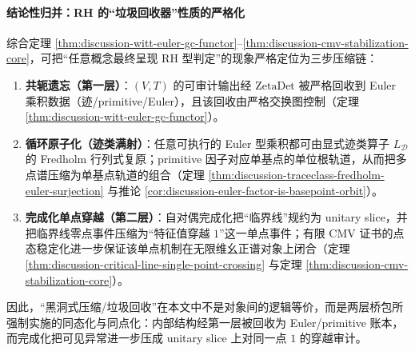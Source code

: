 \paragraph{结论性归并：RH 的“垃圾回收器”性质的严格化}
综合定理 \ref{thm:discussion-witt-euler-gc-functor}--\ref{thm:discussion-cmv-stabilization-core}，可把“任意概念最终呈现 RH 型判定”的现象严格定位为三步压缩链：
\begin{enumerate}
  \item \textbf{共轭遗忘（第一层）}：\((V,T)\) 的可审计输出经 \(\mathrm{ZetaDet}\) 被严格回收到 Euler 乘积数据（迹/primitive/Euler），且该回收由严格交换图控制（定理 \ref{thm:discussion-witt-euler-gc-functor}）。
  \item \textbf{循环原子化（迹类满射）}：任意可执行的 Euler 型乘积都可由显式迹类算子 \(L_{\mathcal D}\) 的 Fredholm 行列式复原；primitive 因子对应单基点的单位根轨道，从而把多点谱压缩为单基点轨道的组合（定理 \ref{thm:discussion-traceclass-fredholm-euler-surjection} 与推论 \ref{cor:discussion-euler-factor-is-basepoint-orbit}）。
  \item \textbf{完成化单点穿越（第二层）}：自对偶完成化把“临界线”规约为 unitary slice，并把临界线零点事件压缩为“特征值穿越 \(1\)”这一单点事件；有限 CMV 证书的点态稳定化进一步保证该单点机制在无限维幺正谱对象上闭合（定理 \ref{thm:discussion-critical-line-single-point-crossing} 与定理 \ref{thm:discussion-cmv-stabilization-core}）。
\end{enumerate}
因此，“黑洞式压缩/垃圾回收”在本文中不是对象间的逻辑等价，而是两层桥包所强制实施的同态化与同点化：内部结构经第一层被回收为 Euler/primitive 账本，而完成化把可见异常进一步压成 unitary slice 上对同一点 \(1\) 的穿越审计。

\endinput
